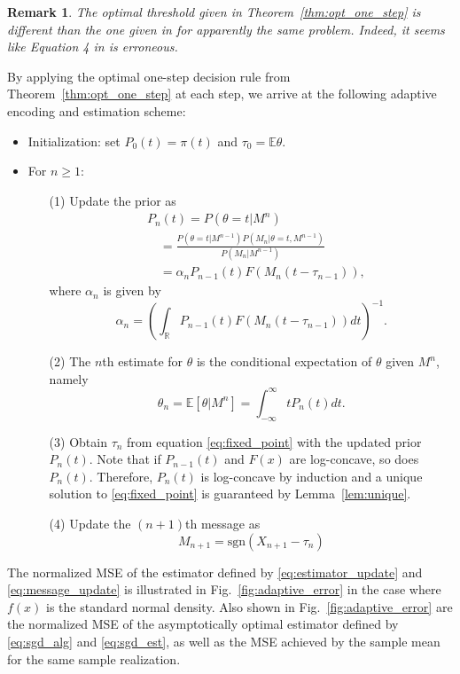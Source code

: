 \documentclass[letterpaper, 11pt]{IEEEtran}      %
\newtheorem{rem}{\bf {Remark}}
\newcommand{\sgn}{\mathrm{sgn} }
\begin{document}
\begin{rem}
The optimal threshold given in Theorem~\ref{thm:opt_one_step} is different than the one given in \cite[Eq. 5]{1619423} for apparently the same problem. Indeed, it seems like Equation 4 in 
\cite{1619423} is erroneous. 
\end{rem}

By applying the optimal one-step decision rule from Theorem~\ref{thm:opt_one_step} at each step, we arrive at the following adaptive encoding and estimation scheme: 
\begin{itemize}
\item Initialization: set $P_0(t) = \pi(t)$ and $\tau_0 = \mathbb E \theta$. 
\item For $n\geq 1$:
\begin{enumerate}
\item[(1)] Update the prior as
\begin{align}
& P_n(t) = P(\theta=t |M^n) \nonumber \\
& \quad = \frac{ P\left( \theta=t | M^{n-1} \right) P(M_n | \theta = t , M^{n-1})  } { P(M_n | M^{n-1} )} \nonumber \\ 
& \quad = \alpha_n  P_{n-1}(t) F\left(M_n (t - \tau_{n-1}) \right), \label{eq:density_update}
\end{align}
where $\alpha_n$ is given by
\[
\alpha_n = \left(\int_{\mathbb R} P_{n-1}(t) F \left(M_n (t- \tau_{n-1}) \right)  dt \right)^{-1}. 
\]
\item[(2)] The $n$th estimate for $\theta$ is the conditional expectation of $\theta$ given $M^n$, namely
\begin{equation}
\theta_n = \mathbb E \left[ \theta| M^n\right] = \int_{-\infty}^\infty t P_n(t) dt. \label{eq:estimator_update}
\end{equation}
\item[(3)] Obtain $\tau_n$ from equation \eqref{eq:fixed_point} with the updated prior $P_n(t)$. Note that if $P_{n-1}(t)$ and $F(x)$ are log-concave, so does $P_n(t)$. Therefore, $P_n(t)$ is log-concave by induction and a unique solution to \eqref{eq:fixed_point} is guaranteed by Lemma~\ref{lem:unique}. 
\item[(4)] Update the $(n+1)$th message as
\begin{equation}\label{eq:message_update}
M_{n+1} = \sgn(X_{n+1}-\tau_n)
\end{equation}
\end{enumerate}
\end{itemize}
The normalized MSE of the estimator defined by \eqref{eq:estimator_update} and \eqref{eq:message_update} is illustrated in Fig.~\ref{fig:adaptive_error} in the case where $f(x)$ is the standard normal density. Also shown in Fig.~\ref{fig:adaptive_error} are the normalized MSE of the asymptotically optimal estimator defined by \eqref{eq:sgd_alg} and \eqref{eq:sgd_est}, as well as the MSE achieved by the sample mean for the same sample realization. 
\end{document}
